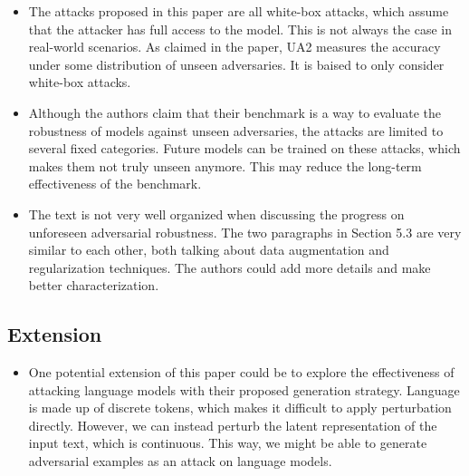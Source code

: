 \documentclass[10pt]{article}
\begin{document}
\begin{itemize}
    \item The attacks proposed in this paper are all white-box attacks, which assume that the attacker has full access to the model. This is not always the case in real-world scenarios. As claimed in the paper, UA2 measures the accuracy under some distribution of unseen adversaries. It is baised to only consider white-box attacks.
    \item Although the authors claim that their benchmark is a way to evaluate the robustness of models against unseen adversaries, the attacks are limited to several fixed categories. Future models can be trained on these attacks, which makes them not truly unseen anymore. This may reduce the long-term effectiveness of the benchmark.
    \item The text is not very well organized when discussing the progress on unforeseen adversarial robustness. The two paragraphs in Section 5.3 are very similar to each other, both talking about data augmentation and regularization techniques. The authors could add more details and make better characterization.
\end{itemize}

\subsection{Extension}

\begin{itemize}
    \item One potential extension of this paper could be to explore the effectiveness of attacking language models with their proposed generation strategy. Language is made up of discrete tokens, which makes it difficult to apply perturbation directly. However, we can instead perturb the latent representation of the input text, which is continuous. This way, we might be able to generate adversarial examples as an attack on language models.
\end{itemize}
\end{document}
